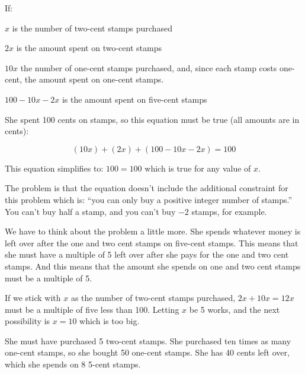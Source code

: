 \documentclass[letterpaper, landscape]{exam}
\begin{document}
  \begin{solution}

    If:
    \begin{itemize*}
      \item $x$ is the number of two-cent stamps purchased
      \item $2x$ is the amount spent on two-cent stamps
      \item $10x$ the number of one-cent stamps purchased, and, since each
        stamp costs one-cent, the amount spent on one-cent stamps.
      \item $100 - 10x - 2x$ is the amount spent on five-cent stamps
    \end{itemize*}

    She spent 100 cents on stamps, so this equation must be true (all amounts
    are in cents):

    \[
      (10x) + (2x) + (100 - 10x - 2x) = 100 
    \]

    This equation simplifies to: $100 = 100$ which is true for any value of $x$.  

    The problem is that the equation doesn't include the additional constraint
    for this problem which is: ``you can only buy a positive integer number of
    stamps.''  You can't buy half a stamp, and you can't buy $-2$ stamps, for
    example.

    We have to think about the problem a little more.  She spends whatever
    money is left over after the one and two cent stamps on five-cent stamps.
    This means that she must have a multiple of 5 left over after she pays for
    the one and two cent stamps.  And this means that the amount she spends on
    one and two cent stamps must be a multiple of 5.  

    If we stick with $x$ as the number of two-cent stamps purchased, $2x + 10x
    = 12x$ must be a multiple of five less than 100.  Letting $x$ be 5 works,
    and the next possibility is $x = 10$ which is too big.  

    She must have purchased 5 two-cent stamps.  She purchased ten times as many
    one-cent stamps, so she bought 50 one-cent stamps.  She has 40 cents left
    over, which she spends on 8 5-cent stamps.  
    

  \end{solution}
\end{document}
